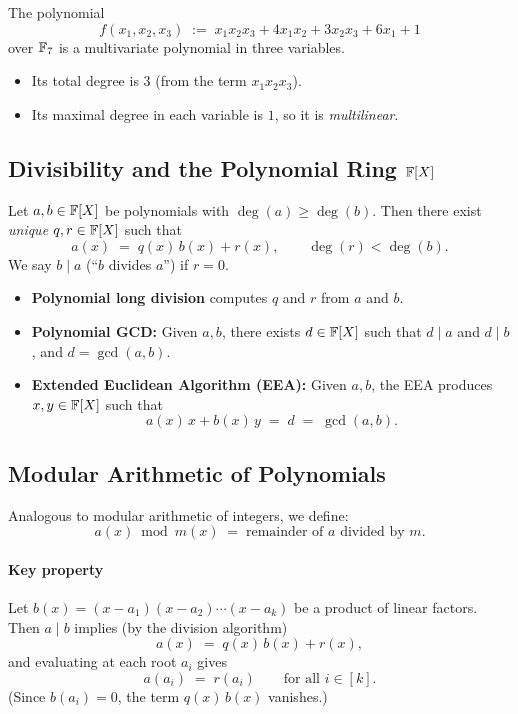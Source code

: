 \documentclass[11pt]{article}
\begin{document}
\begin{example}
  The polynomial
  \[
    f(x_1, x_2, x_3) \;:=\; x_1 x_2 x_3 + 4x_1 x_2 + 3x_2 x_3 + 6x_1 + 1
  \]
  over $\mathbb{F}_7$ is a multivariate polynomial in three variables.
  \begin{itemize}
    \item Its total degree is $3$ (from the term $x_1 x_2 x_3$).
    \item Its maximal degree in each variable is $1$, so it is \emph{multilinear}.
  \end{itemize}
\end{example}

\subsection{Divisibility and the Polynomial Ring $\mathbb{F}[X]$}

Let $a, b \in \mathbb{F}[X]$ be polynomials with $\deg(a) \geq \deg(b)$. Then there
exist \emph{unique} $q, r \in \mathbb{F}[X]$ such that
\[
  a(x) \;=\; q(x)\,b(x) + r(x), \qquad \deg(r) < \deg(b).
\]
We say $b \mid a$ (``$b$ divides $a$'') if $r = 0$.

\begin{itemize}
  \item \textbf{Polynomial long division} computes $q$ and $r$ from $a$ and $b$.
  \item \textbf{Polynomial GCD:} Given $a, b$, there exists $d \in \mathbb{F}[X]$
        such that $d \mid a$ and $d \mid b$, and $d = \gcd(a, b)$.
  \item \textbf{Extended Euclidean Algorithm (EEA):} Given $a, b$, the EEA
        produces $x, y \in \mathbb{F}[X]$ such that
        \[
          a(x)\,x + b(x)\,y \;=\; d \;=\; \gcd(a, b).
        \]
\end{itemize}

\subsection{Modular Arithmetic of Polynomials}

Analogous to modular arithmetic of integers, we define:
\[
  a(x) \bmod m(x) \;=\; \text{remainder of } a \text{ divided by } m.
\]

\paragraph{Key property}
Let $b(x) = (x - a_1)(x - a_2)\cdots(x - a_k)$ be a product of linear
factors. Then $a \mid b$ implies (by the division algorithm)
\[
  a(x) \;=\; q(x)\,b(x) + r(x),
\]
and evaluating at each root $a_i$ gives
\[
  a(a_i) \;=\; r(a_i) \qquad \text{for all } i \in [k].
\]
(Since $b(a_i) = 0$, the term $q(x)\,b(x)$ vanishes.)
\end{document}
